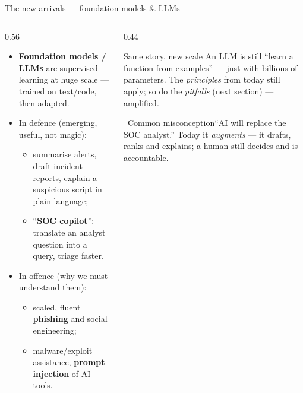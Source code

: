 \documentclass[aspectratio=169,10pt]{beamer}
\newcommand{\term}[1]{{\color{mlink}\textbf{#1}}}         %
\newcommand{\mlterm}[1]{{\color{accent}\textsf{\textbf{#1}}}} %
\newcommand{\myth}[1]{%
  \begin{alertblock}{\small\ding{55}\ Common misconception}\small #1\end{alertblock}}
\begin{document}
\begin{frame}{The new arrivals --- foundation models \& LLMs}
  \begin{columns}[T]
    \begin{column}{0.56\textwidth}
      \begin{itemize}
        \item \mlterm{Foundation models / LLMs} are supervised learning at huge
              scale --- trained on text/code, then adapted.
        \item In defence (emerging, useful, not magic):
        \begin{itemize}
          \item summarise alerts, draft incident reports, explain a suspicious
                script in plain language;
          \item ``\term{SOC copilot}'': translate an analyst question into a
                query, triage faster.
        \end{itemize}
        \item In offence (why we must understand them):
        \begin{itemize}
          \item scaled, fluent \term{phishing} and social engineering;
          \item malware/exploit assistance, \term{prompt injection} of AI tools.
        \end{itemize}
      \end{itemize}
    \end{column}
    \begin{column}{0.44\textwidth}
      \begin{block}{\small Same story, new scale}
        \small An LLM is still ``learn a function from examples'' --- just with
        billions of parameters. The \emph{principles} from today still apply;
        so do the \emph{pitfalls} (next section) --- amplified.
      \end{block}
      \myth{``AI will replace the SOC analyst.'' Today it \emph{augments} ---
      it drafts, ranks and explains; a human still decides and is accountable.}
    \end{column}
  \end{columns}
\end{frame}

\end{document}
